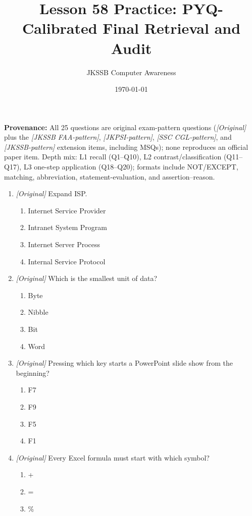 \documentclass[11pt]{article}
\title{Lesson 58 Practice: PYQ-Calibrated Final Retrieval and Audit}
\author{JKSSB Computer Awareness}
\date{\today}
\begin{document}
\maketitle
\noindent\textbf{Provenance:} All 25 questions are original exam-pattern questions (\textit{[Original]} plus the \textit{[JKSSB FAA-pattern]}, \textit{[JKPSI-pattern]}, \textit{[SSC CGL-pattern]}, and \textit{[JKSSB-pattern]} extension items, including MSQs); none reproduces an official paper item.
Depth mix: L1 recall (Q1--Q10), L2 contrast/classification (Q11--Q17),
L3 one-step application (Q18--Q20); formats include NOT/EXCEPT, matching,
abbreviation, statement-evaluation, and assertion--reason.

\begin{enumerate}[label=\textbf{Q\arabic*.}, leftmargin=*]
\item \textit{[Original]} Expand ISP.
  \begin{enumerate}[label=\Alph*.]
    \item Internet Service Provider
    \item Intranet System Program
    \item Internet Server Process
    \item Internal Service Protocol
  \end{enumerate}
\item \textit{[Original]} Which is the smallest unit of data?
  \begin{enumerate}[label=\Alph*.]
    \item Byte
    \item Nibble
    \item Bit
    \item Word
  \end{enumerate}
\item \textit{[Original]} Pressing which key starts a PowerPoint slide show
  from the beginning?
  \begin{enumerate}[label=\Alph*.]
    \item F7
    \item F9
    \item F5
    \item F1
  \end{enumerate}
\item \textit{[Original]} Every Excel formula must start with which symbol?
  \begin{enumerate}[label=\Alph*.]
    \item +
    \item =
    \item \%

\end{enumerate}
\end{enumerate}
\end{document}
